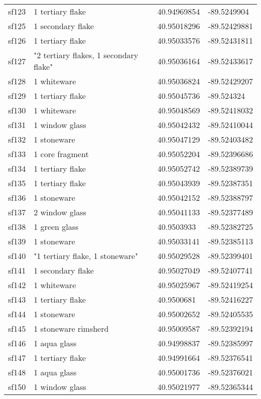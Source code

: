 \begin{longtable}{p{1cm}p{6cm}ll}
	sf123 & 1 tertiary flake & 40.94969854 & -89.5249904\\

	sf125 & 1 secondary flake & 40.95018296 & -89.52429881\\
	sf126 & 1 tertiary flake & 40.95033576 & -89.52431811\\
	sf127 & "2 tertiary flakes, 1 secondary flake" & 40.95036164 & -89.52433617\\
	sf128 & 1 whiteware & 40.95036824 & -89.52429207\\
	sf129 & 1 tertiary flake & 40.95045736 & -89.524324\\
	sf130 & 1 whiteware & 40.95048569 & -89.52418032\\
	sf131 & 1 window glass & 40.95042432 & -89.52410044\\
	sf132 & 1 stoneware & 40.95047129 & -89.52403482\\
	sf133 & 1 core fragment & 40.95052204 & -89.52396686\\
	sf134 & 1 tertiary flake & 40.95052742 & -89.52389739\\
	sf135 & 1 tertiary flake & 40.95043939 & -89.52387351\\
	sf136 & 1 stoneware & 40.95042152 & -89.52388797\\
	sf137 & 2 window glass & 40.95041133 & -89.52377489\\
	sf138 & 1 green glass & 40.9503933 & -89.52382725\\
	sf139 & 1 stoneware & 40.95033141 & -89.52385113\\
	sf140 & "1 tertiary flake, 1 stoneware" & 40.95029528 & -89.52399401\\
	sf141 & 1 secondary flake & 40.95027049 & -89.52407741\\
	sf142 & 1 whiteware & 40.95025967 & -89.52419254\\
	sf143 & 1 tertiary flake & 40.9500681 & -89.52416227\\
	sf144 & 1 stoneware & 40.95002652 & -89.52405535\\
	sf145 & 1 stoneware rimsherd & 40.95009587 & -89.52392194\\
	sf146 & 1 aqua glass & 40.94998837 & -89.52385997\\
	sf147 & 1 tertiary flake & 40.94991664 & -89.52376541\\
	sf148 & 1 aqua glass & 40.95001736 & -89.52376021\\

	sf150 & 1 window glass & 40.95021977 & -89.52365344\\


\end{longtable}
